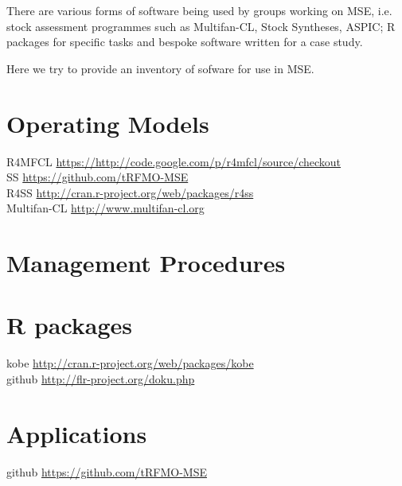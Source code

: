 \documentclass[a4paper,10pt]{article}
\title{}
\author{}
\begin{document}
\maketitle

There are various forms of software being used by groups working on MSE, i.e. stock assessment
programmes such as Multifan-CL, Stock Syntheses, ASPIC; R packages for specific tasks
and bespoke software written for a case study.


Here we try to provide an inventory of sofware for use in MSE. 
 
\section{Operating Models}
 
  R4MFCL      \url{https://http://code.google.com/p/r4mfcl/source/checkout}  \\
  SS          \url{https://github.com/tRFMO-MSE} \\
  R4SS        \url{http://cran.r-project.org/web/packages/r4ss}  \\
  Multifan-CL \url{http://www.multifan-cl.org} \\
   
\section{Management Procedures}
 
\section{R packages}
 
 kobe        \url{http://cran.r-project.org/web/packages/kobe}\\
 github      \url{http://flr-project.org/doku.php}  \\
    
\section{Applications}

  github      \url{https://github.com/tRFMO-MSE} \\
   
  
\end{document}
